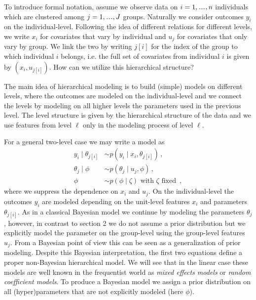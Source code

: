 \vspace{-10pt}
To introduce formal notation, assume we observe data on $i=1,\mydots,n$ individuals which are clustered among $j=1,\mydots,J$ groups.
Naturally we consider outcomes $y_i$ on the individual-level.
Following the idea of different relations for different levels, we write $x_i$ for covariates that vary by individual and $u_j$ for covariates that only vary by group.
We link the two by writing $j[i]$ for the index of the group to which individual $i$ belongs, i.e. the full set of covariates from individual $i$ is given by $(x_i, u_{j[i]})$.
How can we utilize this hierarchical structure?

The main idea of hierarchical modeling is to build (simple) models on different levels, where the outcomes are modeled on the individual-level and we connect the levels by modeling on all higher levels the parameters used in the previous level.
The level structure is given by the hierarchical structure of the data and we use features from level $\ell$ only in the modeling process of level $\ell$.

For a general two-level case we may write a model as
\begin{align}
  y_i \mid \theta_{j[i]} &\sim p(y_i \mid x_i, \theta_{j[i]}) \,,\tag{Individual Level}\\
  \theta_j \mid \phi &\sim p(\theta_j \mid u_j, \phi) \,,\tag{Group Level}\\
  \phi &\sim p(\phi \mid \zeta) \text{ with } \zeta \text{ fixed } \,, \tag{Prior}
\end{align}
where we suppress the dependence on $x_i$ and $u_j$.
On the individual-level the outcomes $y_i$ are modeled depending on the unit-level features $x_i$ and parameters $\theta_{j[i]}$.
As in a classical Bayesian model we continue by modeling the parameters $\theta_j$, however, in contrast to section 2 we do not assume a prior distribution but we explicitly model the parameter on the group-level using the group-level features $u_j$.
From a Bayesian point of view this can be seen as a generalization of prior modeling.
Despite this Bayesian interpretation, the first two equations define a proper non-Bayesian hierarchical model.
We will see that in the linear case these models are well known in the frequentist world as \emph{mixed effects models} or \emph{random coefficient models}.
To produce a Bayesian model we assign a prior distribution on all (hyper)parameters that are not explicitly modeled (here $\phi$).

